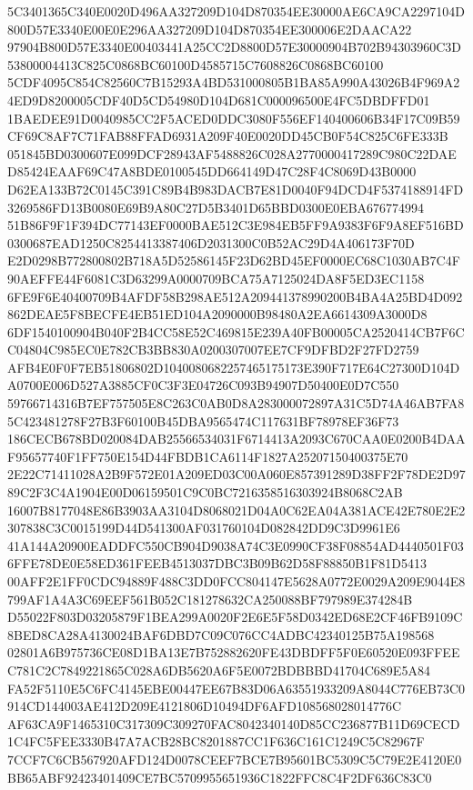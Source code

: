 \documentclass[UTF8,fontset=fandol,zihao=-4,a4paper]{ctexart}
\begin{document}
{{5C3401365C340E0020D496AA327209D104D870354EE30000AE6CA9CA2297104D800D57E3340E00E0E296AA327209D104D870354EE300006E2DAACA22
97904B800D57E3340E00403441A25CC2D8800D57E30000904B702B94303960C3D53800004413C825C0868BC60100D4585715C7608826C0868BC60100
5CDF4095C854C82560C7B15293A4BD531000805B1BA85A990A43026B4F969A24ED9D8200005CDF40D5CD54980D104D681C000096500E4FC5DBDFFD01
1BAEDEE91D0040985CC2F5ACED0DDC3080F556EF140400606B34F17C09B59CF69C8AF7C71FAB88FFAD6931A209F40E0020DD45CB0F54C825C6FE333B
051845BD0300607E099DCF28943AF5488826C028A2770000417289C980C22DAED85424EAAF69C47A8BDE0100545DD664149D47C28F4C8069D43B0000
D62EA133B72C0145C391C89B4B983DACB7E81D0040F94DCD4F5374188914FD3269586FD13B0080E69B9A80C27D5B3401D65BBD0300E0EBA676774994
51B86F9F1F394DC77143EF0000BAE512C3E984EB5FF9A9383F6F9A8EF516BD0300687EAD1250C8254413387406D2031300C0B52AC29D4A406173F70D
E2D0298B772800802B718A5D52586145F23D62BD45EF0000EC68C1030AB7C4F90AEFFE44F6081C3D63299A0000709BCA75A7125024DA8F5ED3EC1158
6FE9F6E40400709B4AFDF58B298AE512A209441378990200B4BA4A25BD4D092862DEAE5F8BECFE4EB51ED104A2090000B98480A2EA6614309A3000D8
6DF1540100904B040F2B4CC58E52C469815E239A40FB00005CA2520414CB7F6CC04804C985EC0E782CB3BB830A0200307007EE7CF9DFBD2F27FD2759
AFB4E0F0F7EB51806802D1040080682257465175173E390F717E64C27300D104DA0700E006D527A3885CF0C3F3E04726C093B94907D50400E0D7C550
59766714316B7EF757505E8C263C0AB0D8A283000072897A31C5D74A46AB7FA85C423481278F27B3F60100B45DBA9565474C117631BF78978EF36F73
186CECB678BD020084DAB25566534031F6714413A2093C670CAA0E0200B4DAAF95657740F1FF750E154D44FBDB1CA6114F1827A25207150400375E70
2E22C71411028A2B9F572E01A209ED03C00A060E857391289D38FF2F78DE2D9789C2F3C4A1904E00D06159501C9C0BC7216358516303924B8068C2AB
16007B8177048E86B3903AA3104D8068021D04A0C62EA04A381ACE42E780E2E2307838C3C0015199D44D541300AF031760104D082842DD9C3D9961E6
41A144A20900EADDFC550CB904D9038A74C3E0990CF38F08854AD4440501F036FFE78DE0E58ED361FEEB4513037DBC3B09B62D58F88850B1F81D5413
00AFF2E1FF0CDC94889F488C3DD0FCC804147E5628A0772E0029A209E9044E8799AF1A4A3C69EEF561B052C181278632CA250088BF797989E374284B
D55022F803D03205879F1BEA299A0020F2E6E5F58D0342ED68E2CF46FB9109C8BED8CA28A4130024BAF6DBD7C09C076CC4ADBC42340125B75A198568
02801A6B975736CE08D1BA13E7B752882620FE43DBDFF5F0E60520E093FFEEC781C2C7849221865C028A6DB5620A6F5E0072BDBBBD41704C689E5A84
FA52F5110E5C6FC4145EBE00447EE67B83D06A63551933209A8044C776EB73C0914CD144003AE412D209E4121806D10494DF6AFD108568028014776C
AF63CA9F1465310C317309C309270FAC8042340140D85CC236877B11D69CECD1C4FC5FEE3330B47A7ACB28BC8201887CC1F636C161C1249C5C82967F
7CCF7C6CB567920AFD124D0078CEEF7BCE7B95601BC5309C5C79E2E4120E0BB65ABF92423401409CE7BC5709955651936C1822FFC8C4F2DF636C83C0
}}
\end{document}
